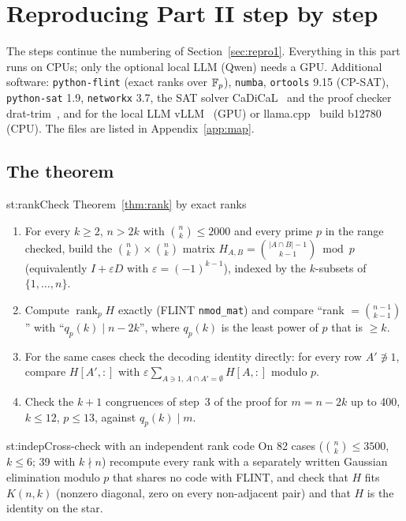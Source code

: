 \section{Reproducing Part II step by step}\label{sec:repro2}

The steps continue the numbering of Section~\ref{sec:repro1}. Everything in this part runs on CPUs; only the
optional local LLM (Qwen) needs a GPU. Additional software: \texttt{python-flint} (exact ranks over $\mathbb{F}_p$),
\texttt{numba}, \texttt{ortools} 9.15 (CP-SAT), \texttt{python-sat} 1.9, \texttt{networkx} 3.7, the SAT solver
CaDiCaL~\cite{cadical} and the proof checker drat-trim~\cite{drattrim}, and for the local LLM vLLM~\cite{vllm} (GPU)
or llama.cpp~\cite{llamacpp} build b12780 (CPU). The files
are listed in Appendix~\ref{app:map}.

\subsection{The theorem}

\begin{step}{st:rank}{Check Theorem~\ref{thm:rank} by exact ranks}
\begin{enumerate}
  \item For every $k\ge2$, $n>2k$ with $\binom nk\le2000$ and every prime $p$ in the range checked, build the
  $\binom nk\times\binom nk$ matrix $H_{A,B}=\binom{|A\cap B|-1}{k-1} \bmod p$ (equivalently $I+\varepsilon D$ with
  $\varepsilon=(-1)^{k-1}$), indexed by the $k$-subsets of $\{1,\dots,n\}$.
  \item Compute $\operatorname{rank}_p H$ exactly (FLINT \texttt{nmod\_mat}) and compare ``rank $=\binom{n-1}{k-1}$''
  with ``$q_p(k)\mid n-2k$'', where $q_p(k)$ is the least power of $p$ that is $\ge k$.
  \item For the same cases check the decoding identity directly: for every row $A'\not\ni1$, compare $H[A',:]$ with
  $\varepsilon\sum_{A\ni1,\,A\cap A'=\emptyset}H[A,:]$ modulo $p$.
  \item Check the $k+1$ congruences of step~3 of the proof for $m=n-2k$ up to 400, $k\le12$, $p\le13$, against
  $q_p(k)\mid m$.
\end{enumerate}
\end{step}

\begin{step}{st:indep}{Cross-check with an independent rank code}
On 82 cases ($\binom nk\le3500$, $k\le6$; 39 with $k\nmid n$) recompute every rank with a separately written
Gaussian elimination modulo $p$ that shares no code with FLINT, and check that $H$ fits $K(n,k)$ (nonzero diagonal,
zero on every non-adjacent pair) and that $H$ is the identity on the star.
\end{step}

